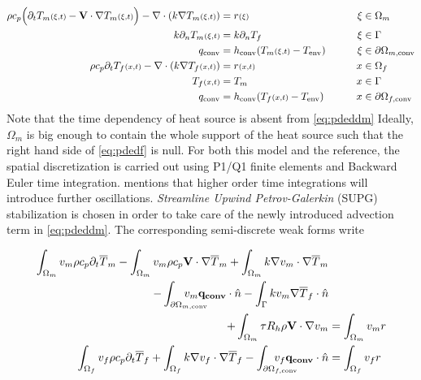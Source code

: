 \begin{align}
  \rho c_p \Big( \partial_t T_m{\scriptstyle (\xi, t)} - \mathbf{V} \cdot \nabla T_m{\scriptstyle (\xi, t)} \Big) -
  \nabla \cdot ( k \nabla T_m{\scriptstyle (\xi, t)}) &= r{\scriptstyle (\xi)}  &\xi &\in \Omega_m \label{eq:pdeddm}\\
  k \partial_n T_m{\scriptstyle (\xi, t)} &= k \partial_n T_f  &\xi &\in \Gamma \notag\\
  q_{\textrm{conv}} &= h_{\textrm{conv}} ( T_m{\scriptstyle(\xi,t)} - T_{\textrm{env}} ) \qquad &\xi &\in \partial \Omega_{m, \textrm{conv}}\notag\\
  \rho c_p \partial_t T_f{\scriptstyle (x, t)} - \nabla \cdot (k \nabla T_f{\scriptstyle (x, t)}) &= r{\scriptstyle (x, t)} \qquad &x &\in \Omega_f \label{eq:pdedf}\\
  T_f{\scriptstyle (x, t)} &= T_m \qquad &x &\in \Gamma \label{eq:dirichletdf}\\
  q_{\textrm{conv}} &= h_{\textrm{conv}} ( T_f{\scriptstyle(x,t)} - T_{\textrm{env}} ) \qquad &x &\in \partial \Omega_{f, \textrm{conv}}\notag
\end{align}
Note that
the time dependency of heat source is absent from \ref{eq:pdeddm}
Ideally, $\Omega_m$ is big enough
to contain the whole support of the heat source such that
the right hand side of \ref{eq:pdedf} is null.
For both this model and the reference, the spatial discretization
is carried out using P1/Q1 finite elements and Backward Euler
time integration. \citep{Puso2023} mentions that higher order
time integrations will introduce further oscillations.
\textit{Streamline Upwind Petrov-Galerkin} (SUPG) stabilization is chosen
in order to take care of the newly introduced advection term
in \ref{eq:pdeddm}. The corresponding semi-discrete weak forms write

\begin{align}
  \label{eq:weakformdm}
    \int_{\Omega_m} v_m \rho c_p \partial_t \overline{T}_m 
  - \int_{\Omega_m} v_m \rho c_p \mathbf{V} \cdot \nabla \overline{T}_m
  + \int_{\Omega_m} k \nabla v_m \cdot \nabla \overline{T}_m&\\
  - \int_{\partial \Omega_{m, \textrm{conv}}} \hspace{-8mm} v_m \mathbf{q_{conv}} \cdot \hat{n}
  - \int_{\Gamma} k v_m \nabla \overline{T}_f \cdot \hat{n} &\notag\\
  + \int_{\Omega_m} \tau R_h \rho \mathbf{V} \cdot \nabla v_m &= \int_{\Omega_m} v_m r \notag\\
  \label{eq:weakformdf}
    \int_{\Omega_f} v_f \rho c_p \partial_t \overline{T}_f 
  + \int_{\Omega_f} k \nabla v_f \cdot \nabla \overline{T}_f
  - \int_{\partial \Omega_{f, \textrm{conv}}} \hspace{-8mm} v_f \mathbf{q_{conv}} \cdot \hat{n} &= \int_{\Omega_f} v_f r
\end{align}

